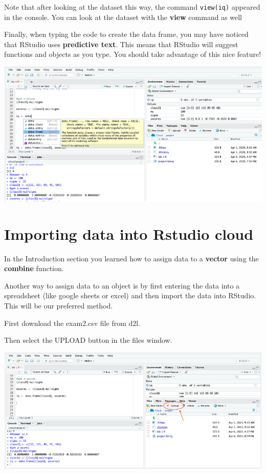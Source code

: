 \documentclass[
]{book}
\begin{document}
Note that after looking at the dataset this way, the command \texttt{view(iq)} appeared in the console. You can look at the dataset with the \textbf{view} command as well

Finally, when typing the code to create the data frame, you may have noticed that RStudio uses \textbf{predictive text}. This means that RStudio will suggest functions and objects as you type. You should take advantage of this nice feature!

\includegraphics{img/autofill.png}

\hypertarget{importing-data-into-rstudio-cloud}{%
\section{Importing data into Rstudio cloud}\label{importing-data-into-rstudio-cloud}}

In the Introduction section you learned how to assign data to a \textbf{vector} using the \textbf{combine} function.

Another way to assign data to an object is by first entering the data into a spreadsheet (like google sheets or excel) and then import the data into RStudio. This will be our preferred method.

First download the exam2.csv file from d2l.

Then select the UPLOAD button in the files window.

\includegraphics{img/upload.png}
\end{document}
